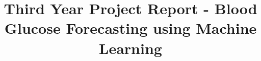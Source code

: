 
\newcommand{\degree}{\ensuremath{^\circ}}
\newcommand{\sus}[1]{$^{\mbox{\scriptsize #1}}$} %
\newcommand{\sub}[1]{$_{\mbox{\scriptsize #1}}$} %
\newcommand{\sect}[1]{Section~\ref{#1}}
\newcommand{\fig}[1]{Fig.~\ref{#1}}
\newcommand{\tab}[1]{Table~\ref{#1}}
\newcommand{\equ}[1]{(\ref{#1})}
\newcommand{\appx}[1]{Appendix~\ref{#1}}




\usepackage[style=ieee,backend=biber,backref=true,hyperref=auto]{biblatex}


  \renewcommand*{\bibfont}










\makeatletter
\title{Third Year Project Report - Blood Glucose Forecasting using Machine Learning}
\makeatother

                                                   
\maketitle


